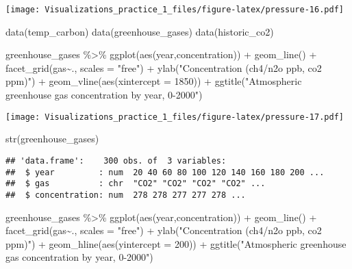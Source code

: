 \documentclass[
]{article}
\newenvironment{Shaded}{\begin{snugshade}}{\end{snugshade}}
\newcommand{\AttributeTok}[1]{\textcolor[rgb]{0.77,0.63,0.00}{#1}}
\newcommand{\DecValTok}[1]{\textcolor[rgb]{0.00,0.00,0.81}{#1}}
\newcommand{\FunctionTok}[1]{\textcolor[rgb]{0.00,0.00,0.00}{#1}}
\newcommand{\NormalTok}[1]{#1}
\newcommand{\SpecialCharTok}[1]{\textcolor[rgb]{0.00,0.00,0.00}{#1}}
\newcommand{\StringTok}[1]{\textcolor[rgb]{0.31,0.60,0.02}{#1}}
\begin{document}
\texttt{[image: Visualizations\_practice\_1\_files/figure-latex/pressure-16.pdf]}

\begin{Shaded}
\begin{Highlighting}[]
\FunctionTok{data}\NormalTok{(temp\_carbon)}
\FunctionTok{data}\NormalTok{(greenhouse\_gases)}
\FunctionTok{data}\NormalTok{(historic\_co2)}


\NormalTok{greenhouse\_gases }\SpecialCharTok{\%\textgreater{}\%}
  \FunctionTok{ggplot}\NormalTok{(}\FunctionTok{aes}\NormalTok{(year,concentration)) }\SpecialCharTok{+}
  \FunctionTok{geom\_line}\NormalTok{() }\SpecialCharTok{+}
  \FunctionTok{facet\_grid}\NormalTok{(gas}\SpecialCharTok{\textasciitilde{}}\NormalTok{., }\AttributeTok{scales =} \StringTok{"free"}\NormalTok{) }\SpecialCharTok{+}
  \FunctionTok{ylab}\NormalTok{(}\StringTok{"Concentration (ch4/n2o ppb, co2 ppm)"}\NormalTok{) }\SpecialCharTok{+} 
  \FunctionTok{geom\_vline}\NormalTok{(}\FunctionTok{aes}\NormalTok{(}\AttributeTok{xintercept =} \DecValTok{1850}\NormalTok{)) }\SpecialCharTok{+}
  \FunctionTok{ggtitle}\NormalTok{(}\StringTok{"Atmospheric greenhouse gas concentration by year, 0{-}2000"}\NormalTok{)}
\end{Highlighting}
\end{Shaded}

\texttt{[image: Visualizations\_practice\_1\_files/figure-latex/pressure-17.pdf]}

\begin{Shaded}
\begin{Highlighting}[]
\FunctionTok{str}\NormalTok{(greenhouse\_gases)}
\end{Highlighting}
\end{Shaded}

\begin{verbatim}
## 'data.frame':    300 obs. of  3 variables:
##  $ year         : num  20 40 60 80 100 120 140 160 180 200 ...
##  $ gas          : chr  "CO2" "CO2" "CO2" "CO2" ...
##  $ concentration: num  278 278 277 277 278 ...
\end{verbatim}

\begin{Shaded}
\begin{Highlighting}[]
\NormalTok{greenhouse\_gases }\SpecialCharTok{\%\textgreater{}\%}
  \FunctionTok{ggplot}\NormalTok{(}\FunctionTok{aes}\NormalTok{(year,concentration)) }\SpecialCharTok{+}
  \FunctionTok{geom\_line}\NormalTok{() }\SpecialCharTok{+}
  \FunctionTok{facet\_grid}\NormalTok{(gas}\SpecialCharTok{\textasciitilde{}}\NormalTok{., }\AttributeTok{scales =} \StringTok{"free"}\NormalTok{) }\SpecialCharTok{+}
  \FunctionTok{ylab}\NormalTok{(}\StringTok{"Concentration (ch4/n2o ppb, co2 ppm)"}\NormalTok{) }\SpecialCharTok{+} 
  \FunctionTok{geom\_hline}\NormalTok{(}\FunctionTok{aes}\NormalTok{(}\AttributeTok{yintercept =} \DecValTok{200}\NormalTok{)) }\SpecialCharTok{+}
  \FunctionTok{ggtitle}\NormalTok{(}\StringTok{"Atmospheric greenhouse gas concentration by year, 0{-}2000"}\NormalTok{)}
\end{Highlighting}
\end{Shaded}
\end{document}
